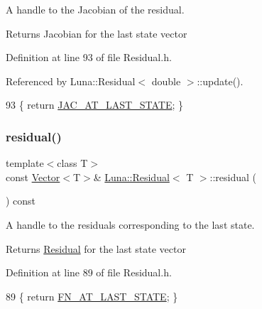 A handle to the Jacobian of the residual. 

\begin{DoxyReturn}{Returns}
Jacobian for the last state vector 
\end{DoxyReturn}


Definition at line 93 of file Residual.\+h.



Referenced by Luna\+::\+Residual$<$ double $>$\+::update().


\begin{DoxyCode}
93 \{ \textcolor{keywordflow}{return} \hyperlink{classLuna_1_1Residual_ac76c460240288f84309b587c785df06a}{JAC\_AT\_LAST\_STATE}; \}
\end{DoxyCode}
\mbox{\label{classLuna_1_1Residual_a023ed8f4d0a5fa7acca0c982c746b662}} 
\subsubsection{\texorpdfstring{residual()}{residual()}}
{\footnotesize\ttfamily template$<$class T$>$ \\
const \hyperlink{classLuna_1_1Vector}{Vector}$<$T$>$\& \hyperlink{classLuna_1_1Residual}{Luna\+::\+Residual}$<$ T $>$\+::residual (\begin{DoxyParamCaption}{ }\end{DoxyParamCaption}) const\hspace{0.3cm}{\ttfamily [inline]}}



A handle to the residuals corresponding to the last state. 

\begin{DoxyReturn}{Returns}
\hyperlink{classLuna_1_1Residual}{Residual} for the last state vector 
\end{DoxyReturn}


Definition at line 89 of file Residual.\+h.


\begin{DoxyCode}
89 \{ \textcolor{keywordflow}{return} \hyperlink{classLuna_1_1Residual_ac7b086911239d3f42ceec4a826e83543}{FN\_AT\_LAST\_STATE}; \}
\end{DoxyCode}
\mbox{\label{classLuna_1_1Residual_ae1b1ebe3314c788b176bcac7b328de5c}} 
